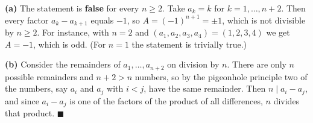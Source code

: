 \textbf{(a)} The statement is \textbf{false} for every $n\ge2$. Take $a_k=k$ for $k=1,\dots,n+2$. Then every factor $a_k-a_{k+1}$ equals $-1$, so $A=(-1)^{n+1}=\pm1$, which is not divisible by $n\ge2$. For instance, with $n=2$ and $(a_1,a_2,a_3,a_4)=(1,2,3,4)$ we get $A=-1$, which is odd. (For $n=1$ the statement is trivially true.)

\textbf{(b)} Consider the remainders of $a_1,\dots,a_{n+2}$ on division by $n$. There are only $n$ possible remainders and $n+2>n$ numbers, so by the pigeonhole principle two of the numbers, say $a_i$ and $a_j$ with $i<j$, have the same remainder. Then $n\mid a_i-a_j$, and since $a_i-a_j$ is one of the factors of the product of all differences, $n$ divides that product. $\blacksquare$
